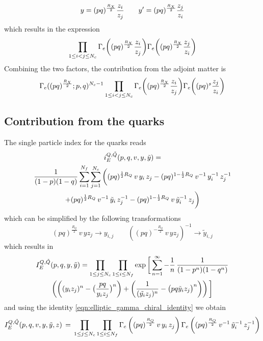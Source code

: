 \begin{appendices}
\begin{equation}
	 y = (pq)^{\frac{R_X}{2}} {z_i \over z_j} \qquad y'= (pq)^{\frac{R_X}{2}} {z_j \over z_i}
\end{equation}
which results in the expression
\begin{equation}
\prod_{1\leq i<j\leq N_c} \Gamma_e \bigg( (pq)^\frac{R_X}{2} {z_i \over z_j} \bigg) \Gamma_e \bigg( (pq)^\frac{R_X}{2} {z_j \over z_i}\bigg)
\end{equation}
Combining the two factors, the contribution from the adjoint matter is 
\begin{equation}
\Gamma_e( (pq)^\frac{R_X}{2};p,q)^{N_c-1} \displaystyle \prod_{1\leq i<j\leq N_c} {\Gamma_e \bigg( (pq)^\frac{R_X}{2} {z_i \over z_j} \bigg) \Gamma_e \bigg( (pq)^s {z_j \over z_i}\bigg)}
\end{equation}

\subsection{Contribution from the quarks}

The single particle index for the quarks reads
\begin{multline}
i_E^{Q,\tilde{Q}} (p,q,v,y,\tilde{y})=\\ 
{1\over (1-p)(1-q)} \sum_{i=1}^{N_f} \sum_{j=1}^{N_c}
\bigg(
(p q)^{{1\over 2}R_Q} \, v \, y_i \, z_j
- (p q)^{1- {1\over 2} R_Q} \, v^{-1} \, y_i^{-1} \, z_j^{-1} \\
 + 
(p q)^{{1\over 2}R_Q}\, v^{-1}\, {\tilde y}_i \,z_j^{-1}
- (p q)^{1- {1\over 2}R_Q} \, v\, {\tilde y_i}^{-1}\, z_j\bigg) 
\end{multline}
which can be simplified by the following transformations
\begin{equation}
(pq)^{\frac{R_Q}{2}} \, v \, y z_j \rightarrow  y_{i,j} \qquad 
\left( (pq)^{- \frac{R_Q}{2}} \, v \, y z_j \right)^{-1}\rightarrow  \tilde{y}_{i,j}
\end{equation}
which results in
\begin{multline}
I_E^{Q,\tilde{Q}}(p,q,y,\tilde{y})  =
\prod_{ 1 \leq j \leq N_c} \prod_{ 1 \leq i \leq N_f} \exp \bigg[ \sum_{n=1}^{\infty} - {1 \over n} \, {1 \over (1-p^n)( 1-q^n)}
\\
\left( \bigg( (y_i z_j)^n - \big({ pq \over y_i z_j}\big)^n \bigg) + \left(  {1 \over  (\tilde{y_i} z_j)^n } - \big( { pq \tilde y_i z_j} \big)^n \right)  \right) \bigg]
\end{multline}
and using the identity \eqref{eqn:elliptic_gamma_chiral_identity} we obtain
\begin{equation}
I_E^{Q,\tilde{Q}} ( p ,q,v,y,\tilde{y},z) \, = \, \prod_{ 1 \leq j \leq N_c} \prod_{ 1 \leq i \leq N_f} \Gamma_e \left( (pq)^{R_Q \over 2} \, v  \,  y_i \,  z_j \right)
\Gamma_e \left( (pq)^{R_Q \over 2}\,  v^{-1} \,  {\tilde y_i}^{-1}\,  z_j^{-1}\right)
\end{equation}















\end{appendices}
